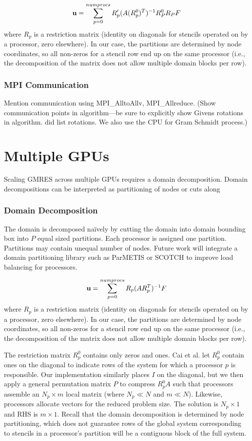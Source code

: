 \begin{align} 
\mathbf{u} = \sum_{p=0}^{numprocs} R_p' (A (R_p^0)^T)^{-1}  R_P^0 R_P F
\end{align} 
where $R_p$ is a restriction matrix (identity on diagonals for stencils operated on by a processor, zero elsewhere). In our case, the partitions are determined by node coordinates, so all non-zeros for a stencil row end up on the same processor (i.e., the decomposition of the matrix does not allow multiple domain blocks per row). 



\subsubsection{MPI Communication} 
Mention communication using MPI\_AlltoAllv, MPI\_Allreduce. (Show communication points in algorithm---be sure to explicitly show Givens rotations in algorithm. \cite{Bahi2011} did list rotations. We also use the CPU for Gram Schmidt process.) 
\section{Multiple GPUs}

Scaling GMRES across multiple GPUs requires a domain decomposition. Domain decompositions can be interpreted as partitioning of nodes or cuts along 

\subsubsection{Domain Decomposition} 
The domain is decomposed na\"{i}vely by cutting the domain into domain bounding box into $P$ equal sized partitions. Each processor is assigned one partition. Partitions may contain unequal number of nodes. Future work will integrate a domain partitioning library such as ParMETIS \cite{KarypisXXX} or SCOTCH \cite{Scotch} to improve load balancing for processors. 

\begin{align} 
\mathbf{u} = \sum_{p=0}^{numprocs} R_p (A R_p^T)^{-1}  F
\end{align} 
where $R_p$ is a restriction matrix (identity on diagonals for stencils operated on by a processor, zero elsewhere). In our case, the partitions are determined by node coordinates, so all non-zeros for a stencil row end up on the same processor (i.e., the decomposition of the matrix does not allow multiple domain blocks per row). 

The restriction matrix $R^0_p$ contains only zeros and ones. Cai et al. \cite{Cai1998} let $R^0_p$ contain ones on the diagonal to indicate rows of the system for which a processor $p$ is responsible. Our implementation similarly places $I$ on the diagonal, but we then apply a general permutation matrix $P$ to compress $R^0_p A$ such that processors assemble an $N_p \times m$ local matrix (where $N_p \ll N$ and $m \ll N$). Likewise, processors allocate vectors for the reduced problem size. The solution is $N_p \times 1$ and RHS is $m \times 1$. Recall that the domain decomposition is determined by node partitioning, which does not guarantee rows of the global system corresponding to stencils in a processor's partition will be a contiguous block of the full system. 


